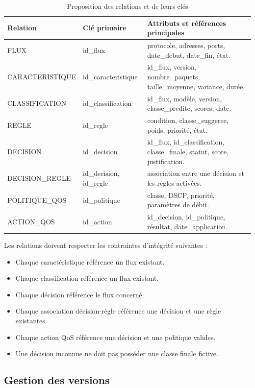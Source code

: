 \begin{table}[H]
\centering
\caption{Proposition des relations et de leurs clés}
\label{tab:schema_relationnel_detaille}
\small
\begin{tabularx}{\textwidth}{|l|X|X|}
\hline
\textbf{Relation} & \textbf{Clé primaire} & \textbf{Attributs et références principales} \\
\hline
FLUX &
id\_flux &
protocole, adresses, ports, date\_debut, date\_fin, état. \\
\hline
CARACTERISTIQUE &
id\_caracteristique &
id\_flux, version, nombre\_paquets, taille\_moyenne, variance, durée. \\
\hline
CLASSIFICATION &
id\_classification &
id\_flux, modèle, version, classe\_predite, scores, date. \\
\hline
REGLE &
id\_regle &
condition, classe\_suggeree, poids, priorité, état. \\
\hline
DECISION &
id\_decision &
id\_flux, id\_classification, classe\_finale, statut, score, justification. \\
\hline
DECISION\_REGLE &
id\_decision, id\_regle &
association entre une décision et les règles activées. \\
\hline
POLITIQUE\_QOS &
id\_politique &
classe, DSCP, priorité, paramètres de débit. \\
\hline
ACTION\_QOS &
id\_action &
id\_decision, id\_politique, résultat, date\_application. \\
\hline
\end{tabularx}
\end{table}

Les relations doivent respecter les contraintes d'intégrité suivantes :

\begin{itemize}
    \item Chaque caractéristique référence un flux existant.
    \item Chaque classification référence un flux existant.
    \item Chaque décision référence le flux concerné.
    \item Chaque association décision-règle référence une décision et une règle existantes.
    \item Chaque action QoS référence une décision et une politique valides.
    \item Une décision inconnue ne doit pas posséder une classe finale fictive.
\end{itemize}

\subsection{Gestion des versions}

